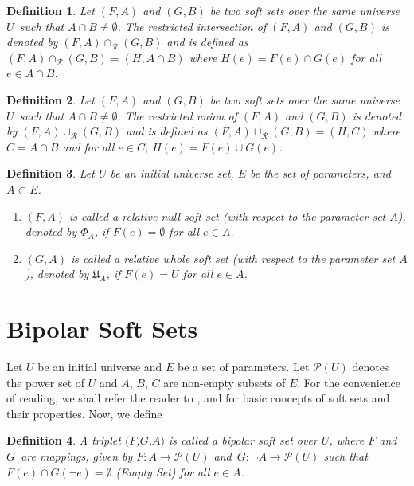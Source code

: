 \documentclass{amsart}
\theoremstyle{plain}
\newtheorem{definition}{Definition}
\numberwithin{equation}{section}
\begin{document}
\begin{definition}
\cite{[3]} Let $(F,A)$ and $(G,B)$ be two soft sets over the same universe $U
$\ such that $A\cap B\neq \emptyset $. The \textit{restricted intersection}
of $(F,A)$ and $(G,B)$ is denoted by $(F,A)\cap _{\mathcal{R}}(G,B)$ and is
defined as $(F,A)\cap _{\mathcal{R}}(G,B)=(H,A\cap B)$ where $H(e)=F(e)\cap
G(e)$ for all $e\in A\cap B$.
\end{definition}

\begin{definition}
\cite{[2]} Let $(F,A)$ and $(G,B)$ be two soft sets over the same universe $U $\ such that $A\cap B\neq \emptyset $. The \textit{restricted union} of $(F,A)$ and $(G,B)$ is denoted by $(F,A)\cup _{\mathcal{R}}(G,B)$ and is
defined as $(F,A)\cup _{\mathcal{R}}(G,B)=(H,C)$ where $C=A\cap B$ and for
all $e\in C$, $H(e)=F(e)\cup G(e)$.
\end{definition}

\begin{definition}
\cite{[3]} Let $U$ be an initial universe set, $E$ be the set of parameters,
and $A\subset E$.

\begin{enumerate}
\item $(F,A)$ is called a relative null soft set (with respect to the
parameter set $A$), denoted by $\Phi _{A}$, if $F(e)=\emptyset $ for all $e\in A$.

\item $(G,A)$ is called a relative whole soft set (with respect to the
parameter set $A$), denoted by $\mathfrak{U}_{A}$, if $F(e)=U$ for all $e\in
A$.
\end{enumerate}
\end{definition}

\section{Bipolar Soft Sets}

Let $U$ be an initial universe and $E$ be a set of parameters. Let $\mathcal{P}(U)$ denotes the power set of $U$ and $A$, $B$, $C$ are non-empty subsets
of $E$. For the convenience of reading, we shall refer the reader to \cite{[1]}, \cite{[2]} and \cite{[3]} for basic concepts of soft sets and their
properties. Now, we define

\begin{definition}
A triplet $(F$,$G$,$A)$ is called a \textit{bipolar} soft set over $U$,
where $F$ and $G$\ are mappings, given by $F:A\rightarrow \mathcal{P}(U)$
and\ $G:\lnot A\rightarrow \mathcal{P}(U)$ such that $F(e)\cap G(\lnot
e)=\emptyset $ (Empty Set) for all $e\in A$.
\end{definition}
\end{document}
